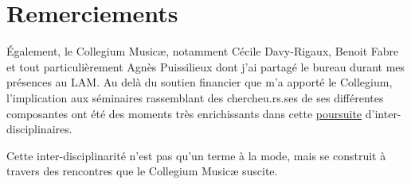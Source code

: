 %
\chapter*{Remerciements}
\label{sec:acknowledgement}
\vspace*{-10mm}



Également, le Collegium Musicæ, notamment Cécile Davy-Rigaux, Benoit Fabre et tout particulièrement Agnès Puissilieux dont j'ai partagé le bureau durant mes présences au LAM. Au delà du soutien financier que m'a apporté le Collegium, l'implication aux séminaires rassemblant des chercheu.rs.ses de ses différentes composantes ont été des moments très enrichissants dans cette \ul{poursuite} d'inter-disciplinaires. 

Cette inter-disciplinarité n'est pas qu'un terme à la mode, mais se construit à travers des rencontres que le Collegium Musicæ suscite.




